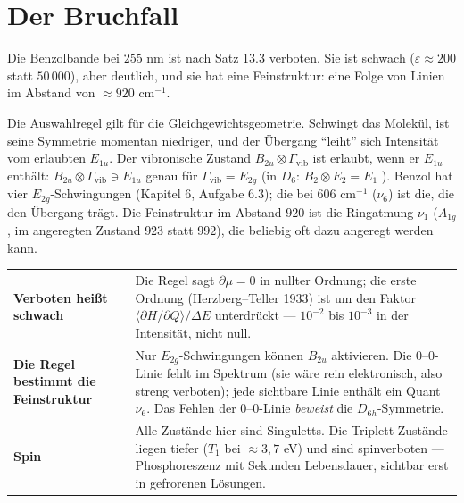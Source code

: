 \section{Der Bruchfall}

\begin{warnung}
Die Benzolbande bei $255$ nm ist nach Satz 13.3 verboten. Sie ist schwach ($\varepsilon\approx200$ statt $50\,000$), aber deutlich, und sie hat eine Feinstruktur: eine Folge von Linien im Abstand von $\approx920$ cm$^{-1}$.

Die Auswahlregel gilt für die Gleichgewichtsgeometrie. Schwingt das Molekül, ist seine Symmetrie momentan niedriger, und der Übergang \enquote{leiht} sich Intensität vom erlaubten $E_{1u}$. Der vibronische Zustand $B_{2u}\otimes\Gamma_{\mathrm{vib}}$ ist erlaubt, wenn er $E_{1u}$ enthält: $B_{2u}\otimes\Gamma_{\mathrm{vib}}\ni E_{1u}$ genau für $\Gamma_{\mathrm{vib}} = E_{2g}$ (in $D_6$: $B_2\otimes E_2 = E_1$ \checkmark). Benzol hat vier $E_{2g}$-Schwingungen (Kapitel 6, Aufgabe 6.3); die bei $606$ cm$^{-1}$ ($\nu_6$) ist die, die den Übergang trägt. Die Feinstruktur im Abstand $920$ ist die Ringatmung $\nu_1$ ($A_{1g}$, im angeregten Zustand $923$ statt $992$), die beliebig oft dazu angeregt werden kann.

\begin{center}
{\small
\renewcommand{\arraystretch}{1.5}
\begin{tabular}{@{}P{3.2cm}P{5.4cm}@{}}
\toprule
\textbf{Verboten heißt schwach} & Die Regel sagt $\partial\mu = 0$ in nullter Ordnung; die erste Ordnung (Herzberg--Teller 1933) ist um den Faktor $\langle\partial H/\partial Q\rangle/\Delta E$ unterdrückt --- $10^{-2}$ bis $10^{-3}$ in der Intensität, nicht null.\\
\textbf{Die Regel bestimmt die Feinstruktur} & Nur $E_{2g}$-Schwingungen können $B_{2u}$ aktivieren. Die $0$--$0$-Linie fehlt im Spektrum (sie wäre rein elektronisch, also streng verboten); jede sichtbare Linie enthält ein Quant $\nu_6$. Das Fehlen der $0$--$0$-Linie \emph{beweist} die $D_{6h}$-Symmetrie.\\
\textbf{Spin} & Alle Zustände hier sind Singuletts. Die Triplett-Zustände liegen tiefer ($T_1$ bei $\approx3{,}7$ eV) und sind spinverboten --- Phosphoreszenz mit Sekunden Lebensdauer, sichtbar erst in gefrorenen Lösungen.\\
\bottomrule
\end{tabular}}
\end{center}


\end{warnung}
